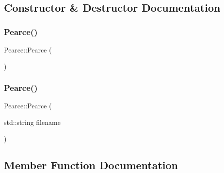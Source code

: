 \subsection{Constructor \& Destructor Documentation}
\mbox{\label{class_pearce_a4ad24a40c64e8f3481dd0dbbcb8d2bcb_a4ad24a40c64e8f3481dd0dbbcb8d2bcb}} 
\subsubsection{\texorpdfstring{Pearce()}{Pearce()}\hspace{0.1cm}{\footnotesize\ttfamily [1/2]}}
{\footnotesize\ttfamily Pearce\+::\+Pearce (\begin{DoxyParamCaption}{ }\end{DoxyParamCaption})\hspace{0.3cm}{\ttfamily [default]}}

\mbox{\label{class_pearce_a0851b1b696528448c1a42dbb6b4e6c8f_a0851b1b696528448c1a42dbb6b4e6c8f}} 
\subsubsection{\texorpdfstring{Pearce()}{Pearce()}\hspace{0.1cm}{\footnotesize\ttfamily [2/2]}}
{\footnotesize\ttfamily Pearce\+::\+Pearce (\begin{DoxyParamCaption}\item[{std\+::string}]{filename }\end{DoxyParamCaption})\hspace{0.3cm}{\ttfamily [inline]}}



\subsection{Member Function Documentation}
\mbox{\label{class_pearce_a6d6c641f1815e11536554077ed18c10e_a6d6c641f1815e11536554077ed18c10e}} 
